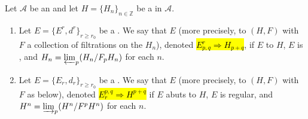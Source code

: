 \begin{definition} \label{definition:converges_to_a_graded_object_for_a_spectral_sequence_in_an_abelian_category}
    Let $\mathcal{A}$ be an  and let $H = \{H_n\}_{n \in \mathbb{Z}}$ be a  in $\mathcal{A}$.

    \begin{enumerate}
        \item Let $E = \{E^r, d^r\}_{r \ge r_0}$ be a . We say that $E$  (more precisely, to $(H,F)$ with $F$ a collection of filtrations on the $H_n$), denoted \hl{$E^r_{p,q} \Rightarrow H_{p+q}$}, if $E$  to $H$, $E$ is , and $H_n = \varprojlim_{p} (H_n /F_p H_n)$ for each $n$.
        

        \item Let $E = \{E_r, d_r\}_{r \ge r_0}$ be a . We say that $E$  (more precisely, to $(H,F)$ with $F$ as below), denoted \hl{$E_r^{p,q} \Rightarrow H^{p+q}$} if $E$ abuts to $H$, $E$ is regular, and $H^n = \varinjlim_{p} (H^n /F^p H^n)$ for each $n$.

        



\end{enumerate}
\end{definition}
